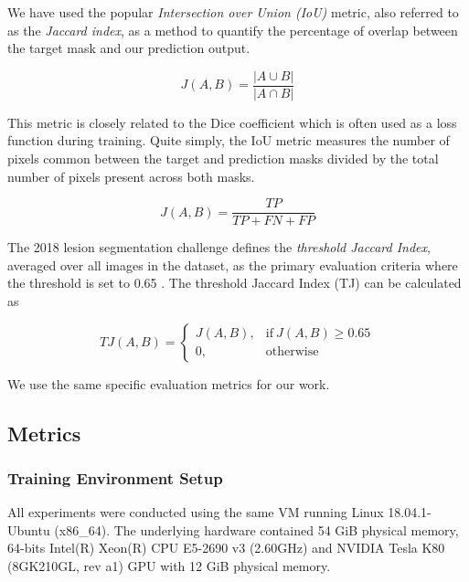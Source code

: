 We have used the popular \emph{Intersection over Union (IoU)} metric, also referred to as the \emph{Jaccard index}, as a method to quantify the percentage of overlap between the target mask and our prediction output.

\begin{equation}
  J(A, B) = \frac{|A \cup B|}{|A \cap B|}
\end{equation}

This metric is closely related to the Dice coefficient which is often used as a loss function during training. Quite simply, the IoU metric measures the number of pixels common between the target and prediction masks divided by the total number of pixels present across both masks.

\begin{equation}
  J(A, B) = \frac{TP}{TP + FN + FP}
\end{equation}


The 2018 lesion segmentation challenge defines the \emph{threshold Jaccard Index}, averaged over all images in the dataset, as the primary evaluation criteria where the threshold is set to 0.65 \citep{challenge-2018-codella}. The threshold Jaccard Index (TJ) can be calculated as

\begin{equation}
  TJ(A, B) = \begin{cases}
      J(A, B), & \text{if}\ J(A, B) \geq{0.65} \\
      0, & \text{otherwise}
    \end{cases}
\end{equation}

We use the same specific evaluation metrics for our work.


\subsection{Metrics}

\subsubsection{Training Environment Setup}

All experiments were conducted using the same VM running Linux 18.04.1-Ubuntu (x86\_64). The underlying hardware contained 54 GiB physical memory, 64-bits Intel(R) Xeon(R) CPU E5-2690 v3 (2.60GHz) and NVIDIA Tesla K80 (8GK210GL, rev a1) GPU with 12 GiB physical memory.

